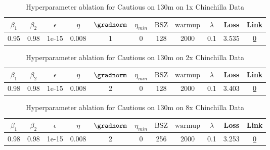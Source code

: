 \begin{table}[H]
\centering
\caption{Hyperparameter ablation for Cautious on 130m on 1x Chinchilla Data}
\label{tab:ablation_cautious_130m_1}
\begin{tabular}{ccccccccccc}
\toprule
$\beta_1$ & $\beta_2$ & $\epsilon$ & $\eta$ & $\gradnorm$ & $\eta_{min}$ & $\mathrm{BSZ}$ & $\mathrm{warmup}$ & $\lambda$ & Loss & Link \\
\midrule
0.95 & 0.98 & 1e-15 & 0.008 & 1 & 0 & 128 & 2000 & 0.1 & 3.535 & \href{https://wandb.ai/stanford-mercury/optimizer-scaling/runs/sweep-130m-2B-cautious7b0572lr0.008-wd0.1-minlr0-warmup2000-b10.-085cb0}{0} \\
\midrule
\bottomrule
\end{tabular}
\end{table}

\begin{table}[H]
\centering
\caption{Hyperparameter ablation for Cautious on 130m on 2x Chinchilla Data}
\label{tab:ablation_cautious_130m_2}
\begin{tabular}{ccccccccccc}
\toprule
$\beta_1$ & $\beta_2$ & $\epsilon$ & $\eta$ & $\gradnorm$ & $\eta_{min}$ & $\mathrm{BSZ}$ & $\mathrm{warmup}$ & $\lambda$ & Loss & Link \\
\midrule
0.98 & 0.98 & 1e-15 & 0.008 & 2 & 0 & 128 & 2000 & 0.1 & 3.403 & \href{https://wandb.ai/stanford-mercury/optimizer-scaling/runs/sweep-130m-5B-cautiousce8123lr0.008-wd0.1-minlr0-warmup2000-b10.-fd1867}{0} \\
\midrule
\bottomrule
\end{tabular}
\end{table}

\begin{table}[H]
\centering
\caption{Hyperparameter ablation for Cautious on 130m on 8x Chinchilla Data}
\label{tab:ablation_cautious_130m_8}
\begin{tabular}{ccccccccccc}
\toprule
$\beta_1$ & $\beta_2$ & $\epsilon$ & $\eta$ & $\gradnorm$ & $\eta_{min}$ & $\mathrm{BSZ}$ & $\mathrm{warmup}$ & $\lambda$ & Loss & Link \\
\midrule
0.98 & 0.98 & 1e-15 & 0.008 & 2 & 0 & 256 & 2000 & 0.1 & 3.253 & \href{https://wandb.ai/stanford-mercury/optimizer-scaling/runs/sweep-130m-21B-cautious3e1de9lr0.008-wd0.1-minlr0-warmup2000-b10-8f1bb6}{0} \\
\midrule
\bottomrule
\end{tabular}
\end{table}

